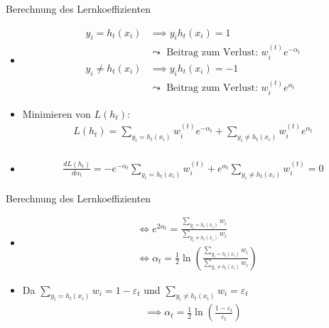 \documentclass[hyperref={bookmarks=false},11pt,dvipsnames]{beamer}
\begin{document}
\begin{frame}[t]{Berechnung des Lernkoeffizienten}
	\begin{itemize}
		\item <1-> [] \begin{align*}
			      y_i = h_t(x_i)    & \implies y_ih_t(x_i)  = 1                                     \\
			                        & \leadsto \text{ Beitrag zum Verlust: } w_i^{(t)}e^{-\alpha_t} \\
			      y_i \neq h_t(x_i) & \implies y_ih_t(x_i)  = -1                                    \\
			                        & \leadsto \text{ Beitrag zum Verlust: } w_i^{(t)}e^{\alpha_t}
		      \end{align*}
		\item <3-> Minimieren von $L(h_t)$:\begin{align*}
			      L(h_t) = \sum_{y_i=h_t(x_i)}w_i^{(t)}e^{-\alpha_t} + \sum_{y_i\neq h_t(x_i)} w_i^{(t)}e^{\alpha_t} \\
		      \end{align*}
		\item<4->[] \begin{align*}
			      \frac{dL(h_t)}{d\alpha_t} = -e^{-\alpha_t}\sum_{y_i=h_t(x_i)}w_i^{(t)} + e^{\alpha_t}\sum_{y_i\neq h_t(x_i)}w_i^{(t)} = 0
		      \end{align*}
	\end{itemize}
\end{frame}

\begin{frame}[t]{Berechnung des Lernkoeffizienten}
	\begin{itemize}
		\item <1-> [] \begin{align*}
			       & \Leftrightarrow e^{2\alpha_t} = \frac{\sum_{y_i=h_t(x_i)}w_i}{\sum_{y_i\neq h_t(x_i)}w_i}                       \\
			       & \Leftrightarrow \alpha_t = \frac{1}{2}\ln\left(\frac{\sum_{y_i=h_t(x_i)}w_i}{\sum_{y_i\neq h_t(x_i)}w_i}\right)
		      \end{align*}
		\item<2-> Da $\sum_{y_i=h_t(x_i)}w_i=1-\varepsilon_t$ und $\sum_{y_i\neq h_t(x_i)}w_i=\varepsilon_t$\begin{align*}
			      \implies \alpha_t =\frac{1}{2}\ln\left(\frac{1-\varepsilon_t}{\varepsilon_t}\right)
		      \end{align*}
	\end{itemize}
\end{frame}
\end{document}
